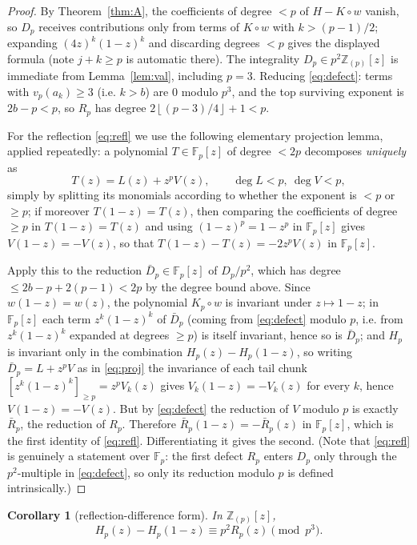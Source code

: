 \documentclass[11pt]{amsart}
\newtheorem{corollary}[theorem]{Corollary}
\theoremstyle{definition}
\theoremstyle{remark}
\newcommand{\Fp}{\mathbb{F}_p}
\newcommand{\Zp}{\mathbb{Z}_{(p)}}
\newcommand{\fl}[1]{\left\lfloor #1 \right\rfloor}
\begin{document}
\begin{proof}
By Theorem~\ref{thm:A}, the coefficients of degree $<p$ of $H-K\circ w$
vanish, so $D_p$ receives contributions only from terms of $K\circ w$
with $k>(p-1)/2$; expanding $(4z)^k(1-z)^k$ and discarding degrees
$<p$ gives the displayed formula (note $j+k\ge p$ is automatic there).
The integrality $D_p\in p^2\Zp[z]$ is immediate from
Lemma~\ref{lem:val}, including $p=3$. Reducing \eqref{eq:defect}: terms
with $v_p(a_k)\ge3$ (i.e. $k>b$) are $0$ modulo $p^3$, and the top
surviving exponent is $2b-p<p$, so $R_p$ has degree $2\fl{(p-3)/4}+1<p$.

For the reflection \eqref{eq:refl} we use the following elementary
projection lemma, applied repeatedly: a polynomial $T\in\Fp[z]$ of
degree $<2p$ decomposes \emph{uniquely} as
\begin{equation}\label{eq:proj}
T(z)=L(z)+z^pV(z),\qquad \deg L<p,\ \deg V<p,
\end{equation}
simply by splitting its monomials according to whether the exponent is
$<p$ or $\ge p$; if moreover $T(1-z)=T(z)$, then comparing the
coefficients of degree $\ge p$ in $T(1-z)=T(z)$ and using
$(1-z)^p=1-z^p$ in $\Fp[z]$ gives $V(1-z)=-V(z)$, so that
$T(1-z)-T(z)=-2z^pV(z)$ in $\Fp[z]$.

Apply this to the reduction $\bar D_p\in\Fp[z]$ of $D_p/p^2$, which has
degree $\le 2b-p+2(p-1)<2p$ by the degree bound above. Since
$w(1-z)=w(z)$, the polynomial $K_p\circ w$ is invariant under
$z\mapsto1-z$; in $\Fp[z]$ each term $z^k(1-z)^k$ of
$\bar D_p$ (coming from \eqref{eq:defect} modulo $p$, i.e. from
$z^k(1-z)^k$ expanded at degrees $\ge p$) is itself invariant, hence so
is $\bar D_p$; and $H_p$ is invariant only in the combination
$H_p(z)-H_p(1-z)$, so writing $\bar D_p=L+z^pV$ as in \eqref{eq:proj}
the invariance of each tail chunk $[z^k(1-z)^k]_{\ge p}=z^pV_k(z)$
gives $V_k(1-z)=-V_k(z)$ for every $k$, hence $V(1-z)=-V(z)$. But by
\eqref{eq:defect} the reduction of $V$ modulo $p$ is exactly
$\bar R_p$, the reduction of $R_p$. Therefore
$\bar R_p(1-z)=-\bar R_p(z)$ in $\Fp[z]$, which is the first identity
of \eqref{eq:refl}. Differentiating it gives the second. (Note that
\eqref{eq:refl} is genuinely a statement over $\Fp$: the first defect
$R_p$ enters $D_p$ only through the $p^2$-multiple in
\eqref{eq:defect}, so only its reduction modulo $p$ is defined
intrinsically.)
\end{proof}

\begin{corollary}[reflection-difference form]\label{cor:refldiff}
In $\Zp[z]$,
\begin{equation}\label{eq:refldiff}
H_p(z)-H_p(1-z)\equiv p^2R_p(z)\pmod{p^3}.
\end{equation}
\end{corollary}
\end{document}
